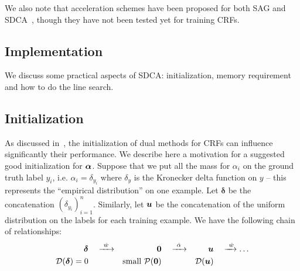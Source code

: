We also note that acceleration schemes have been proposed for both SAG and SDCA~\citep{lin2015catalyst, shalev2016accelerated}, though they have not been tested yet for training CRFs.



\clearpage
\begin{subappendices}
	
	\section{Implementation} \label{app:sec:implementation}
	We discuss some practical aspects of SDCA: initialization, memory requirement and how to do the line search.
	
	\subsection{Initialization}\label{app:ssec:initialization}
	
	As discussed in~\citet{schmidt2015non}, the initialization of dual methods for CRFs can influence significantly their performance.
	We describe here a motivation for a suggested good initialization for $\boldsymbol{\alpha}$.
	Suppose that we put all the mass for $\alpha_i$ on the ground truth label $y_i$, i.e. $\alpha_i = \delta_{y_i}$ where $\delta_y$ is the Kronecker delta function on $y$ -- this represents the ``empirical distribution'' on one example.
	Let $\bm\delta$ be the concatenation $(\delta_{y_i})_{i=1} ^n$.
	Similarly, let $\bm u$ be the concatenation of the uniform distribution on the labels for each training example.
	We have the following chain of relationships:
	\begin{align*}
		\bm\delta & \quad \xrightarrow{~\hat w~} & \bm{0} & \quad \xrightarrow{~\hat \alpha~} & \bm u & \quad \xrightarrow{~\hat w} \dots \\
		{\mathcal D}(\bm\delta)=0 &  & \text{small } {\mathcal P}(\bm{0}) &  & {\mathcal D}(\bm u) &
	\end{align*}
	

\end{subappendices}

